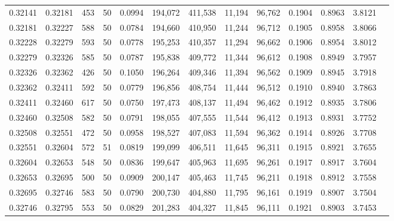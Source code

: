 \begin{tabular}{rrrrrrrrrrrrr}
0.32141 & 0.32181 &   453 &  50 &                                     0.0994 & 194,072 & 411,538 &  11,194 &  96,762 & 0.1904 & 0.8963 & 3.8121 \\
0.32181 & 0.32227 &   588 &  50 &                                     0.0784 & 194,660 & 410,950 &  11,244 &  96,712 & 0.1905 & 0.8958 & 3.8066 \\
0.32228 & 0.32279 &   593 &  50 &                                     0.0778 & 195,253 & 410,357 &  11,294 &  96,662 & 0.1906 & 0.8954 & 3.8012 \\
0.32279 & 0.32326 &   585 &  50 &                                     0.0787 & 195,838 & 409,772 &  11,344 &  96,612 & 0.1908 & 0.8949 & 3.7957 \\
0.32326 & 0.32362 &   426 &  50 &                                     0.1050 & 196,264 & 409,346 &  11,394 &  96,562 & 0.1909 & 0.8945 & 3.7918 \\
0.32362 & 0.32411 &   592 &  50 &                                     0.0779 & 196,856 & 408,754 &  11,444 &  96,512 & 0.1910 & 0.8940 & 3.7863 \\
0.32411 & 0.32460 &   617 &  50 &                                     0.0750 & 197,473 & 408,137 &  11,494 &  96,462 & 0.1912 & 0.8935 & 3.7806 \\
0.32460 & 0.32508 &   582 &  50 &                                     0.0791 & 198,055 & 407,555 &  11,544 &  96,412 & 0.1913 & 0.8931 & 3.7752 \\
0.32508 & 0.32551 &   472 &  50 &                                     0.0958 & 198,527 & 407,083 &  11,594 &  96,362 & 0.1914 & 0.8926 & 3.7708 \\
0.32551 & 0.32604 &   572 &  51 &                                     0.0819 & 199,099 & 406,511 &  11,645 &  96,311 & 0.1915 & 0.8921 & 3.7655 \\
0.32604 & 0.32653 &   548 &  50 &                                     0.0836 & 199,647 & 405,963 &  11,695 &  96,261 & 0.1917 & 0.8917 & 3.7604 \\
0.32653 & 0.32695 &   500 &  50 &                                     0.0909 & 200,147 & 405,463 &  11,745 &  96,211 & 0.1918 & 0.8912 & 3.7558 \\
0.32695 & 0.32746 &   583 &  50 &                                     0.0790 & 200,730 & 404,880 &  11,795 &  96,161 & 0.1919 & 0.8907 & 3.7504 \\
0.32746 & 0.32795 &   553 &  50 &                                     0.0829 & 201,283 & 404,327 &  11,845 &  96,111 & 0.1921 & 0.8903 & 3.7453 \\

\end{tabular}
